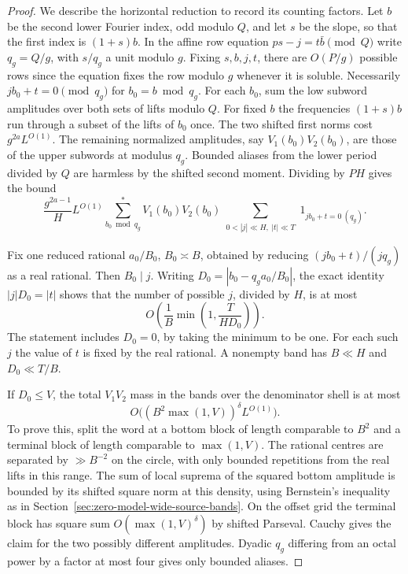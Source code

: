 \documentclass[11pt,a4paper]{article}
\theoremstyle{paperplain}
\numberwithin{equation}{section}
\begin{document}
\begin{proof}
We describe the horizontal reduction to record its counting factors.
Let $b$ be the second lower Fourier index, odd modulo $Q$, and let
$s$ be the slope, so that the first index is $(1+s)b$. In the affine
row equation $ps-j=t\bar b\pmod Q$ write $q_g=Q/g$, with $s/q_g$
a unit modulo $g$. Fixing $s,b,j,t$, there are $O(P/g)$ possible
rows since the equation fixes the row modulo $g$ whenever it is
soluble. Necessarily $jb_0+t=0\pmod{q_g}$ for $b_0=b\bmod q_g$.
For each $b_0$, sum the low subword amplitudes over both sets of
lifts modulo $Q$. For fixed $b$ the frequencies $(1+s)b$ run through
a subset of the lifts of $b_0$ once. The two shifted first norms
cost $g^{2a}L^{O(1)}$. The remaining normalized amplitudes, say
$V_1(b_0)V_2(b_0)$, are those of the upper subwords at modulus
$q_g$. Bounded aliases from the lower period divided by $Q$
are harmless by the shifted second moment. Dividing by $PH$
gives the bound
\[
 \frac{g^{2a-1}}{H}L^{O(1)}
 \sum_{b_0\bmod q_g}^{*} V_1(b_0)V_2(b_0)
       \sum_{\substack{0<|j|\ll H,\ |t|\ll T}}
                    1_{j b_0+t=0\ (q_g)}.
\]

Fix one reduced rational $a_0/B_0$, $B_0\asymp B$, obtained by
reducing $(j b_0+t)/(j q_g)$ as a real rational. Then $B_0\mid j$.
Writing $D_0=|b_0-q_g a_0/B_0|$, the exact identity
$|j|D_0=|t|$ shows that the number of possible $j$, divided by $H$,
is at most
\begin{equation}\label{eq:horizontal-count-per-offset}
 O\left(\frac1B \min\left(1,\frac{T}{H D_0}\right)\right).
\end{equation}
The statement includes $D_0=0$, by taking the minimum to be one.
For each such $j$ the value of $t$ is fixed by the real rational.
A nonempty band has $B\ll H$ and $D_0\ll T/B$.

If $D_0\le V$, the total $V_1V_2$ mass in the bands over the
denominator shell is at most
\[
                  O\bigl((B^2\max(1,V))^\delta L^{O(1)}\bigr).
\]
To prove this, split the word at a bottom block of length
comparable to $B^2$ and a terminal block of length comparable to
$\max(1,V)$. The rational centres are separated by $\gg B^{-2}$
on the circle, with only bounded repetitions from the real lifts
in this range. The sum of local suprema of the squared bottom
amplitude is bounded by its shifted square norm at this density,
using Bernstein's inequality as in
Section~\ref{sec:zero-model-wide-source-bands}. On the offset grid
the terminal block has square sum $O(\max(1,V)^\delta)$ by shifted
Parseval. Cauchy gives the claim for the two possibly different
amplitudes. Dyadic $q_g$ differing from an octal power by a factor
at most four gives only bounded aliases.


\end{proof}
\end{document}
